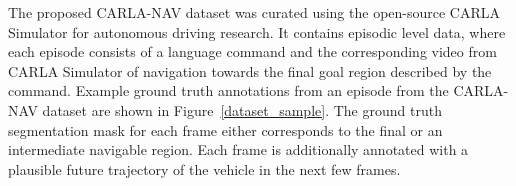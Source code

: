 \documentclass[letterpaper, 10 pt, conference]{ieeeconf}  %
\begin{document}
The proposed CARLA-NAV dataset was curated using the open-source CARLA Simulator for autonomous driving research. It contains episodic level data, where each episode consists of a language command and the corresponding video from CARLA Simulator of navigation towards the final goal region described by the command. Example ground truth annotations from an episode from the CARLA-NAV dataset are shown in Figure~\ref{dataset_sample}. The ground truth segmentation mask for each frame either corresponds to the final or an intermediate navigable region. Each frame is additionally annotated with a plausible future trajectory of the vehicle in the next few frames. 
%

\end{document}
